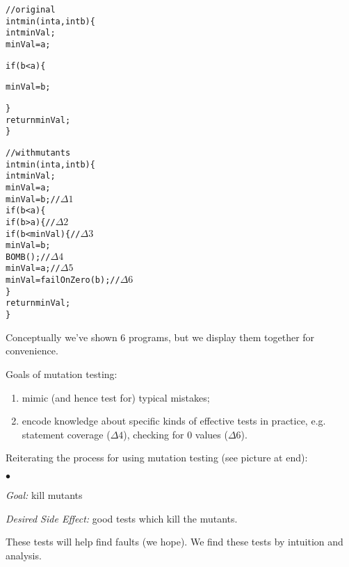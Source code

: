\documentclass[11pt]{article}
\newcommand{\squishlist}{
 \begin{list}{$\bullet$}
  { \setlength{\itemsep}{0pt}
     \setlength{\parsep}{3pt}
     \setlength{\topsep}{3pt}
     \setlength{\partopsep}{0pt}
     \setlength{\leftmargin}{1.5em}
     \setlength{\labelwidth}{1em}
     \setlength{\labelsep}{0.5em} } }
\newcommand{\squishend}{
  \end{list}  }
\begin{document}
{\small
\begin{minipage}[t]{.5\textwidth}
\begin{alltt}
// original
int min(int a, int b) \{
  int minVal;
  minVal = a;

  if (b < a) \{


    minVal = b;



  \}
  return minVal;
\}
\end{alltt}
\end{minipage} \begin{minipage}[t]{.5\textwidth}
\begin{alltt}
// with mutants
int min(int a, int b) \{
  int minVal;
  minVal = a;
  minVal = b;               // \(\Delta 1\)
  if (b < a) \{
  if (b > a) \{              // \(\Delta 2\)
  if (b < minVal) \{         // \(\Delta 3 \)
    minVal = b;
    BOMB();                 // \(\Delta 4\)
    minVal = a;             // \(\Delta 5\)
    minVal = failOnZero(b); // \(\Delta 6\)
  \}
  return minVal;
\}
\end{alltt}
\end{minipage}
}

Conceptually we've shown 6 programs, but we display them together for 
convenience.

Goals of mutation testing:
\begin{enumerate}
\item mimic (and hence test for) typical mistakes;
\item encode knowledge about specific kinds of effective tests in practice, e.g.
statement coverage ($\Delta 4$), checking for 0 values ($\Delta 6$).
\end{enumerate}

Reiterating the process for using mutation testing (see picture at end):
\squishlist
\item \emph{Goal:} kill mutants
\item \emph{Desired Side Effect:} good tests which kill the mutants.
\squishend
These tests will help find faults (we hope). We find these tests by
intuition and analysis.
\end{document}
